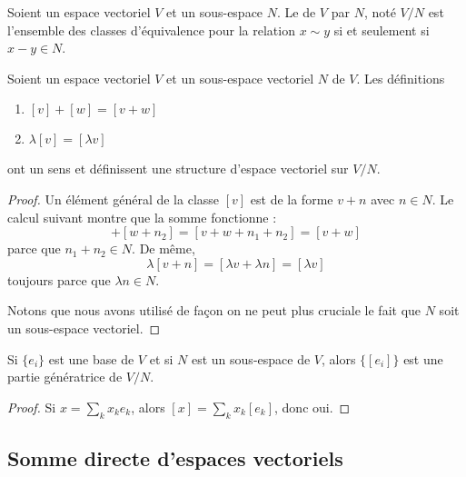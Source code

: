 \begin{definition}
    Soient un espace vectoriel \( V\) et un sous-espace \( N\). Le  de \( V\) par \( N\), noté \( V/N\) est l'ensemble des classes d'équivalence pour la relation \( x\sim y\) si et seulement si \( x-y\in N\).
\end{definition}

\begin{proposition}
    Soient un espace vectoriel \( V\) et un sous-espace vectoriel \( N\) de \( V\). Les définitions
    \begin{enumerate}
        \item
            \( [v]+[w]=[v+w]\)
        \item
            \( \lambda[v]=[\lambda v]\)
    \end{enumerate}
    ont un sens et définissent une structure d'espace vectoriel sur \( V/N\).
\end{proposition}

\begin{proof}
    Un élément général de la classe \( [v]\) est de la forme \( v+n\) avec \( n\in N\). Le calcul suivant montre que la somme fonctionne : 
    \begin{equation}
        [v+n_1]+[w+n_2]=[v+w+n_1+n_2]=[v+w]
    \end{equation}
    parce que \( n_1+n_2\in N\). De même,
    \begin{equation}
        \lambda[v+n]=[\lambda v+\lambda n]=[\lambda v]
    \end{equation}
    toujours parce que \( \lambda n\in N\).

    Notons que nous avons utilisé de façon on ne peut plus cruciale le fait que \( N\) soit un sous-espace vectoriel.
\end{proof}

\begin{proposition}
    Si \( \{ e_i \}\) est une base de \( V\) et si \( N\) est un sous-espace de \( V\), alors \( \{ [e_i] \}\) est une partie génératrice de \( V/N\).
\end{proposition}

\begin{proof}
    Si \( x=\sum_kx_ke_k\), alors \( [x]=\sum_kx_k[e_k]\), donc oui.
\end{proof}

\subsection{Somme directe d'espaces vectoriels}

